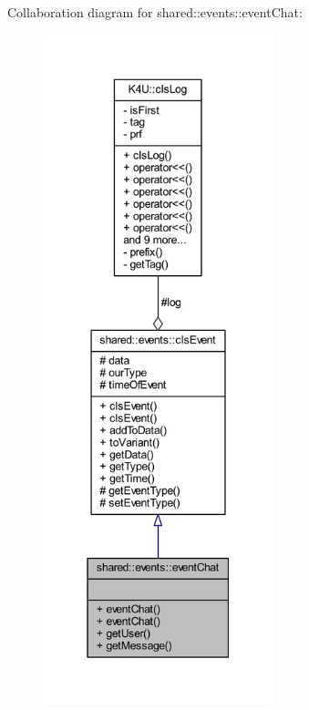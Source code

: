 Collaboration diagram for shared\-:\-:events\-:\-:event\-Chat\-:\nopagebreak
\begin{figure}[H]
\begin{center}
\leavevmode
\includegraphics[height=550pt]{dc/d9a/classshared_1_1events_1_1event_chat__coll__graph}
\end{center}
\end{figure}

